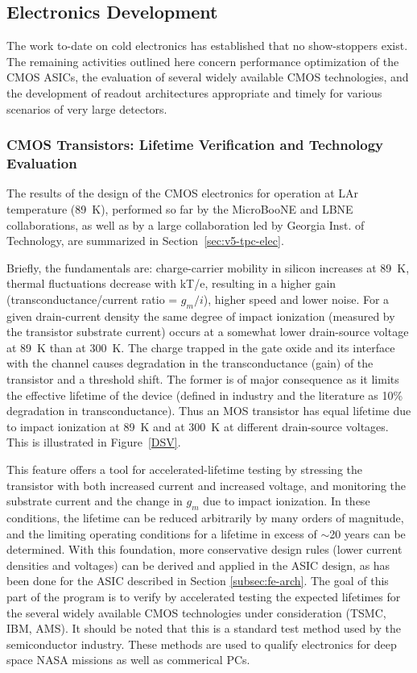  \subsection{Electronics Development}
 The work to-date on cold electronics has established that no show-stoppers exist. The remaining activities outlined here concern performance optimization of the CMOS ASICs, the evaluation of several widely available CMOS technologies, and the development of readout architectures appropriate and timely for various scenarios of very large detectors.

\subsubsection{CMOS Transistors: Lifetime Verification and Technology Evaluation}

The results of the design of the CMOS electronics for operation at LAr temperature (89~K), performed so far by the MicroBooNE and LBNE collaborations, as well as by a large collaboration led by Georgia Inst. of Technology, are summarized in Section~\ref{sec:v5-tpc-elec}.

Briefly, the fundamentals are: charge-carrier mobility in silicon increases at 89~K, thermal fluctuations decrease with kT/e, resulting in a higher gain (transconductance/current ratio =
 $g_{m}/ i$), higher speed and lower noise. For a given drain-current density the same degree of impact ionization (measured by the transistor substrate current) occurs at a somewhat lower drain-source voltage at 89~K than at 300~K. The charge trapped in the gate oxide and its interface with the channel causes degradation in the transconductance (gain) of the transistor and a threshold shift. The former is of major consequence as it limits the effective lifetime of the device (defined in industry and the literature as 10\% degradation in transconductance). Thus an MOS transistor has equal lifetime due to impact ionization at 89~K and at 300~K at different drain-source voltages. This is illustrated in Figure~\ref{DSV}.  

This feature offers a tool for accelerated-lifetime testing by stressing the transistor with both increased current and increased voltage, and monitoring the substrate current and the change  in $g_{m}$ due to impact ionization. In these conditions, the lifetime can be reduced arbitrarily by many orders of magnitude, and the limiting operating conditions for a lifetime in excess of $\sim$20 years can be determined. With this foundation, more conservative design rules (lower current densities and voltages) can be derived and applied in the ASIC design, as has been done for the ASIC described in Section \ref{subsec:fe-arch}. The goal of this part of the program is to verify by accelerated testing the expected lifetimes for the several widely available CMOS technologies under consideration (TSMC, IBM, AMS). It should be noted that this is a standard test method used by the semiconductor industry. These methods are used to qualify electronics for deep space NASA missions as well as commerical PCs.
 

